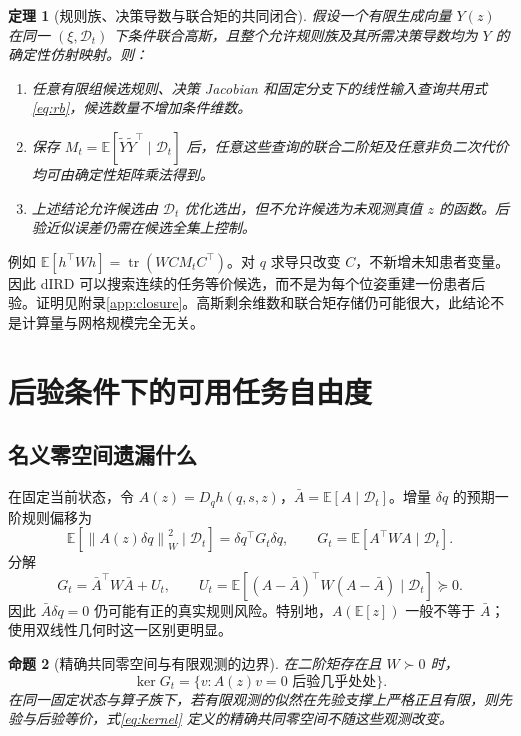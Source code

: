 \documentclass[UTF8,11pt,a4paper,fontset=fandol]{ctexart}
\numberwithin{equation}{section}
\newtheorem{theorem}{定理}[section]
\newtheorem{proposition}[theorem]{命题}
\theoremstyle{definition}
\newcommand{\E}{\mathbb E}
\newcommand{\D}{\mathcal D}
\newcommand{\norm}[1]{\left\lVert#1\right\rVert}
\DeclareMathOperator{\tr}{tr}
\begin{document}
\begin{theorem}[规则族、决策导数与联合矩的共同闭合]
\label{thm:closure}
假设一个有限生成向量 $Y(z)$ 在同一 $(\xi,\D_t)$ 下条件联合高斯，且整个允许规则族及其所需决策导数均为 $Y$ 的确定性仿射映射。则：
\begin{enumerate}
\item 任意有限组候选规则、决策 Jacobian 和固定分支下的线性输入查询共用式\eqref{eq:rb}，候选数量不增加条件维数。
\item 保存 $M_t=\E[\widetilde Y\widetilde Y^\top\mid\D_t]$ 后，任意这些查询的联合二阶矩及任意非负二次代价均可由确定性矩阵乘法得到。
\item 上述结论允许候选由 $\D_t$ 优化选出，但不允许候选为未观测真值 $z$ 的函数。后验近似误差仍需在候选全集上控制。
\end{enumerate}
\end{theorem}

例如 $\E[h^\top Wh]=\tr(W C M_t C^\top)$。对 $q$ 求导只改变 $C$，不新增未知患者变量。因此 dIRD 可以搜索连续的任务等价候选，而不是为每个位姿重建一份患者后验。证明见附录\ref{app:closure}。高斯剩余维数和联合矩存储仍可能很大，此结论不是计算量与网格规模完全无关。

\section{后验条件下的可用任务自由度}
\label{sec:freedom}
\subsection{名义零空间遗漏什么}
在固定当前状态，令 $A(z)=D_qh(q,s,z)$，$\bar A=\E[A\mid\D_t]$。增量 $\delta q$ 的预期一阶规则偏移为
\begin{equation}
 \E[\norm{A(z)\delta q}_W^2\mid\D_t]
 =\delta q^\top G_t\delta q,\qquad G_t=\E[A^\top WA\mid\D_t].
 \label{eq:gram}
\end{equation}
分解
\begin{equation}
 G_t=\bar A^\top W\bar A+U_t,\qquad
 U_t=\E[(A-\bar A)^\top W(A-\bar A)\mid\D_t]\succeq0.
 \label{eq:gap}
\end{equation}
因此 $\bar A\delta q=0$ 仍可能有正的真实规则风险。特别地，$A(\E[z])$ 一般不等于 $\bar A$；使用双线性几何时这一区别更明显。

\begin{proposition}[精确共同零空间与有限观测的边界]
\label{prop:support}
在二阶矩存在且 $W\succ0$ 时，
\begin{equation}
 \ker G_t=\{v:A(z)v=0\text{ 后验几乎处处}\}.
 \label{eq:kernel}
\end{equation}
在同一固定状态与算子族下，若有限观测的似然在先验支撑上严格正且有限，则先验与后验等价，式\eqref{eq:kernel} 定义的精确共同零空间不随这些观测改变。
\end{proposition}
\end{document}
